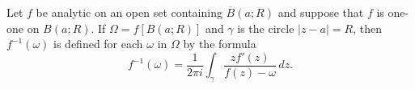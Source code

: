 Let $f$ be analytic on an open set containing $\overline{B}(a; R)$ and suppose that $f$ is one-one on $B(a; R)$. If $\Omega = f[B(a; R)]$ and $\gamma$ is the circle $|z - a| = R$, then $f^{-1}(\omega)$ is defined for each $\omega$ in $\Omega$ by the formula
$$
f^{-1}(\omega) = \frac{1}{2\pi i} \int_{\gamma} \frac{z f'(z)}{f(z) - \omega}\, dz.
$$

